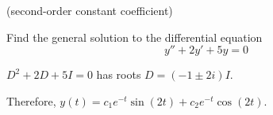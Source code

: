 (second-order constant coefficient)

\nl Find the general solution to the differential equation
$$y'' + 2y' + 5y =0$$

\soln* $D^2 + 2D + 5I = 0$ has roots $D = (-1\pm2i)I$.

Therefore, $y(t) = c_1e^{-t}\sin(2t) + c_2 e^{-t}\cos(2t)$.